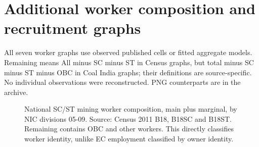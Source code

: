\documentclass[11pt,a4paper]{report}
\begin{document}
\chapter{Additional worker composition and recruitment graphs}
All seven worker graphs use observed published cells or fitted aggregate models. Remaining means All minus SC minus ST in Census graphs, but total minus SC minus ST minus OBC in Coal India graphs; their definitions are source-specific. No individual observations were reconstructed. PNG counterparts are in the archive.
\clearpage\begin{figure}[p]\centering
{}

\caption{National SC/\allowbreak{}ST mining worker composition, main plus marginal, by NIC divisions 05-09. Source: Census 2011 B18, B18SC and B18ST. Remaining contains OBC and other workers. This directly classifies worker identity, unlike EC employment classified by owner identity.}\end{figure}\clearpage
\end{document}
